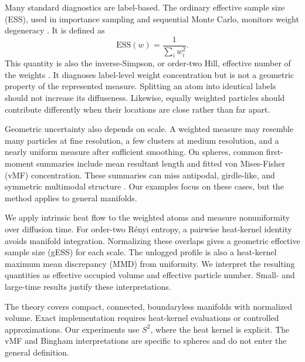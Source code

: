\documentclass[twoside]{article}
\theoremstyle{definition}
\theoremstyle{remark}
\newcommand{\ess}{\mathrm{ESS}}
\begin{document}
Many standard diagnostics are label-based. The
ordinary effective sample size (ESS), used in importance sampling and
sequential Monte Carlo, monitors weight degeneracy
\citep{kong_1994_SequentialImputationsBayesian, liu_1998_SequentialMonteCarlo, delmoral_2006_SequentialMonteCarlo}. It is defined as
\begin{equation*}
  \ess(w)=\frac{1}{\sum_iw_i^2}.  
\end{equation*}
This quantity is also the inverse-Simpson, or order-two Hill, effective number of the
weights \citep{hill_1973_DiversityEvennessUnifying}. It diagnoses label-level
weight concentration but is not a geometric property of the represented
measure. Splitting an atom into identical labels should not increase its
diffuseness. Likewise, equally weighted particles should contribute differently when their locations are close rather than far apart.

Geometric uncertainty also depends on scale. A weighted measure may resemble
many particles at fine resolution, a few clusters at medium resolution, and
a nearly uniform measure after sufficient smoothing. On spheres, common first-moment summaries include mean resultant length and fitted von Mises-Fisher (vMF) concentration.
These summaries can miss antipodal, girdle-like, and symmetric multimodal structure
\citep{fisher_1953_DispersionSphere,mardia_2000_DirectionalStatistics,
banerjee_2005_ClusteringUnitHypersphere}. Our examples focus on these cases, but the method applies to general manifolds.


We apply intrinsic heat flow to the weighted atoms and measure nonuniformity over diffusion time. For order-two R\'enyi entropy, a pairwise heat-kernel identity avoids manifold integration. Normalizing these overlaps gives a geometric effective sample size (gESS) for each scale. The unlogged profile is also a heat-kernel maximum mean discrepancy (MMD) from uniformity. We interpret the resulting quantities as effective occupied volume and effective particle number. Small- and large-time results justify these interpretations.

The theory covers compact,
connected, boundaryless manifolds with normalized volume. Exact
implementation requires heat-kernel evaluations or controlled
approximations. Our experiments use $S^2$, where the heat kernel is explicit.
The vMF and Bingham interpretations are specific to spheres and do not enter the general definition.
\end{document}
